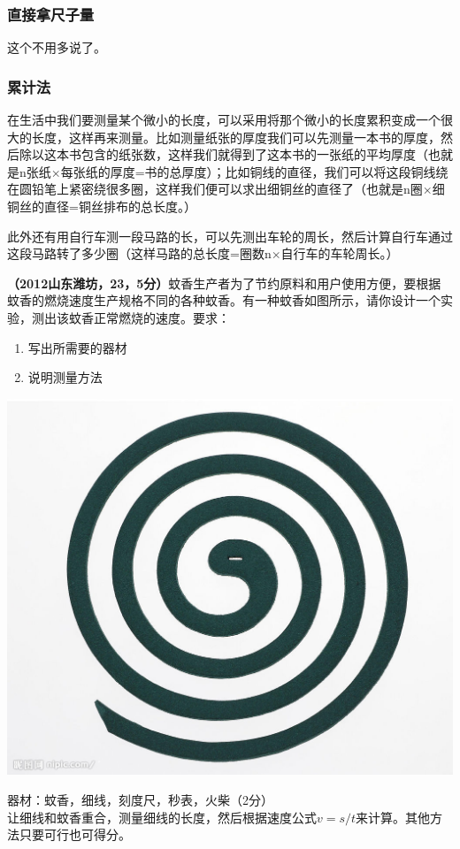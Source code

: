 \documentclass[12pt,twoside]{exam}
\begin{document}
\begin{knowledge}
\subsubsection{直接拿尺子量}
这个不用多说了。

\subsubsection{累计法}
在生活中我们要测量某个微小的长度，可以采用将那个微小的长度累积变成一个很大的长度，这样再来测量。比如测量纸张的厚度我们可以先测量一本书的厚度，然后除以这本书包含的纸张数，这样我们就得到了这本书的一张纸的平均厚度（也就是n张纸$\times$每张纸的厚度=书的总厚度）；比如铜线的直径，我们可以将这段铜线绕在圆铅笔上紧密绕很多圈，这样我们便可以求出细铜丝的直径了（也就是n圈$\times$细铜丝的直径=铜丝排布的总长度。）

此外还有用自行车测一段马路的长，可以先测出车轮的周长，然后计算自行车通过这段马路转了多少圈（这样马路的总长度=圈数n$\times$自行车的车轮周长。）

\textbf{（2012山东潍坊，23，5分）}蚊香生产者为了节约原料和用户使用方便，要根据蚊香的燃烧速度生产规格不同的各种蚊香。有一种蚊香如图所示，请你设计一个实验，测出该蚊香正常燃烧的速度。要求：
\begin{multicols}{2}
\begin{enumerate}
\item 写出所需要的器材
\item 说明测量方法
\end{enumerate}
\columnbreak
\hfill\includegraphics[scale=0.1]{figures/蚊香.jpg} 
\end{multicols}
\pagebreak
\begin{solutionorbox}[12ex]
器材：蚊香，细线，刻度尺，秒表，火柴（2分）\\
让细线和蚊香重合，测量细线的长度，然后根据速度公式$v=s/t$来计算。其他方法只要可行也可得分。
\end{solutionorbox}




\end{knowledge}
\end{document}
